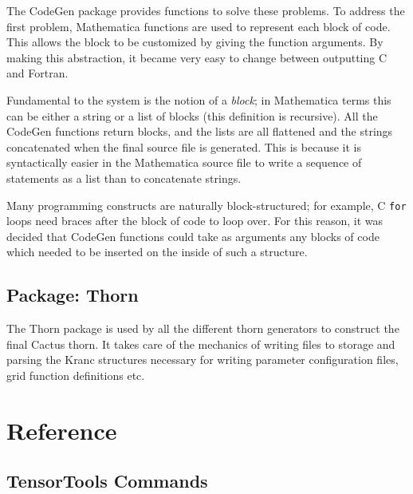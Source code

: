 \documentclass{report}
\begin{document}
The CodeGen package provides functions to solve these problems.  To
address the first problem, Mathematica functions are used to represent
each block of code.  This allows the block to be customized by giving
the function arguments.  By making this abstraction, it became very
easy to change between outputting C and Fortran.

Fundamental to the system is the notion of a {\em block}; in
Mathematica terms this can be either a string or a list of blocks
(this definition is recursive).  All the CodeGen functions return
blocks, and the lists are all flattened and the strings concatenated
when the final source file is generated.  This is because it is
syntactically easier in the Mathematica source file to write a
sequence of statements as a list than to concatenate strings.

Many programming constructs are naturally block-structured; for
example, C {\tt for} loops need braces after the block of code to loop
over.  For this reason, it was decided that CodeGen functions could
take as arguments any blocks of code which needed to be inserted on
the inside of such a structure.

\section{Package: Thorn}

The Thorn package is used by all the different thorn generators to
construct the final Cactus thorn.  It takes care of the mechanics of
writing files to storage and parsing the Kranc structures necessary
for writing parameter configuration files, grid function definitions
etc.

\chapter{Reference}
\label{ch:ref}

\section{TensorTools Commands}
\label{ch:ref:sec:tensortools}
\end{document}
